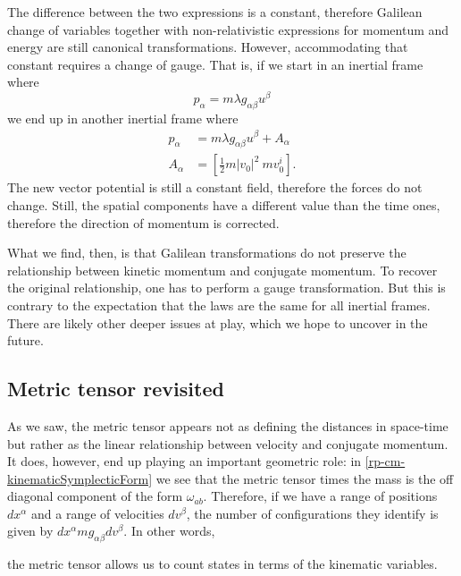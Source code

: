 The difference between the two expressions is a constant, therefore Galilean change of variables together with non-relativistic expressions for momentum and energy are still canonical transformations. However, accommodating that constant requires a change of gauge. That is, if we start in an inertial frame where
\begin{equation}
	p_{\alpha} = m \lambda g_{\alpha\beta} u^{\beta}
\end{equation}
we end up in another inertial frame where
\begin{equation}
	\begin{aligned}
	p_{\alpha} &= m \lambda g_{\alpha\beta} u^{\beta} + A_\alpha \\
	A_\alpha &= \left[\frac{1}{2} m|v_0|^2 \ mv_0^i\right].
	\end{aligned}
\end{equation}
The new vector potential is still a constant field, therefore the forces do not change. Still, the spatial components have a different value than the time ones, therefore the direction of momentum is corrected.

What we find, then, is that Galilean transformations do not preserve the relationship between kinetic momentum and conjugate momentum. To recover the original relationship, one has to perform a gauge transformation. But this is contrary to the expectation that the laws are the same for all inertial frames. There are likely other deeper issues at play, which we hope to uncover in the future.



\subsection{Metric tensor revisited}

As we saw, the metric tensor appears not as defining the distances in space-time but rather as the linear relationship between velocity and conjugate momentum. It does, however, end up playing an important geometric role: in \ref{rp-cm-kinematicSymplecticForm} we see that the metric tensor times the mass is the off diagonal component of the form $\omega_{ab}$. Therefore, if we have a range of positions $dx^\alpha$ and a range of velocities $dv^\beta$, the number of configurations they identify is given by $dx^\alpha m g_{\alpha\beta} dv^\beta$. In other words,
\begin{insight}
	the metric tensor allows us to count states in terms of the kinematic variables.
\end{insight}

